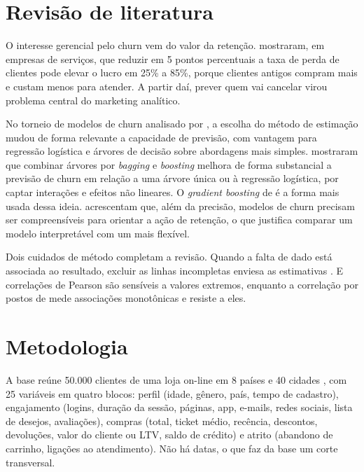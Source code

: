\documentclass[
  article,            %
  12pt,
  oneside,
  a4paper,
  section=TITLE,      %
  english,            %
  brazil              %
]{abntex2}
\begin{document}
\section{Revisão de literatura}

O interesse gerencial pelo churn vem do valor da retenção.  mostraram, em empresas de serviços, que reduzir em 5 pontos percentuais a taxa de perda de clientes pode elevar o lucro em 25\% a 85\%, porque clientes antigos compram mais e custam menos para atender. A partir daí, prever quem vai cancelar virou problema central do marketing analítico.

No torneio de modelos de churn analisado por , a escolha do método de estimação mudou de forma relevante a capacidade de previsão, com vantagem para regressão logística e árvores de decisão sobre abordagens mais simples.  mostraram que combinar árvores por \textit{bagging} e \textit{boosting} melhora de forma substancial a previsão de churn em relação a uma árvore única ou à regressão logística, por captar interações e efeitos não lineares. O \textit{gradient boosting} de  é a forma mais usada dessa ideia.  acrescentam que, além da precisão, modelos de churn precisam ser compreensíveis para orientar a ação de retenção, o que justifica comparar um modelo interpretável com um mais flexível.

Dois cuidados de método completam a revisão. Quando a falta de dado está associada ao resultado, excluir as linhas incompletas enviesa as estimativas \cite{little2019}. E correlações de Pearson são sensíveis a valores extremos, enquanto a correlação por postos de  mede associações monotônicas e resiste a eles.

\section{Metodologia}

A base reúne 50.000 clientes de uma loja on-line em 8 países e 40 cidades \cite{srisyra2026}, com 25 variáveis em quatro blocos: perfil (idade, gênero, país, tempo de cadastro), engajamento (logins, duração da sessão, páginas, app, e-mails, redes sociais, lista de desejos, avaliações), compras (total, ticket médio, recência, descontos, devoluções, valor do cliente ou LTV, saldo de crédito) e atrito (abandono de carrinho, ligações ao atendimento). Não há datas, o que faz da base um corte transversal.
\end{document}

